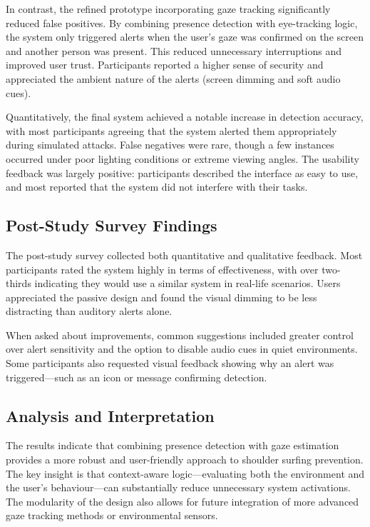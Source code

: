 \documentclass[12pt]{article}
\theoremstyle{plain}
\theoremstyle{definition}
\begin{document}
In contrast, the refined prototype incorporating gaze tracking significantly reduced false positives. By combining presence detection with eye-tracking logic, the system only triggered alerts when the user's gaze was confirmed on the screen and another person was present. This reduced unnecessary interruptions and improved user trust. Participants reported a higher sense of security and appreciated the ambient nature of the alerts (screen dimming and soft audio cues).

Quantitatively, the final system achieved a notable increase in detection accuracy, with most participants agreeing that the system alerted them appropriately during simulated attacks. False negatives were rare, though a few instances occurred under poor lighting conditions or extreme viewing angles. The usability feedback was largely positive: participants described the interface as easy to use, and most reported that the system did not interfere with their tasks.

\subsection{Post-Study Survey Findings}
The post-study survey collected both quantitative and qualitative feedback. Most participants rated the system highly in terms of effectiveness, with over two-thirds indicating they would use a similar system in real-life scenarios. Users appreciated the passive design and found the visual dimming to be less distracting than auditory alerts alone.

When asked about improvements, common suggestions included greater control over alert sensitivity and the option to disable audio cues in quiet environments. Some participants also requested visual feedback showing why an alert was triggered—such as an icon or message confirming detection.

\subsection{Analysis and Interpretation}
The results indicate that combining presence detection with gaze estimation provides a more robust and user-friendly approach to shoulder surfing prevention. The key insight is that context-aware logic—evaluating both the environment and the user's behaviour—can substantially reduce unnecessary system activations. The modularity of the design also allows for future integration of more advanced gaze tracking methods or environmental sensors.
\end{document}
